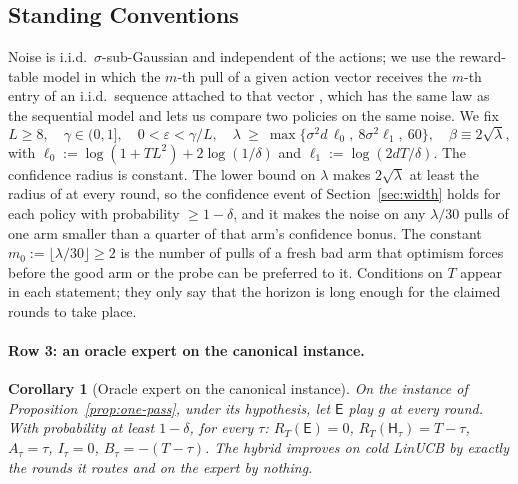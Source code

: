 \documentclass{article}
\newtheorem{corollary}{Corollary}
\theoremstyle{definition}
\theoremstyle{remark}
\newcommand{\eps}{\varepsilon}
\theoremstyle{remark}
\newcommand{\Exp}{\mathsf{E}}
\newcommand{\Hyb}{\mathsf{H}}
\begin{document}
\subsection{Standing Conventions}
\label{sec:template}

Noise is i.i.d.\ $\sigma$-sub-Gaussian and independent of the actions; we use
the reward-table model in which the $m$-th pull of a given action vector
receives the $m$-th entry of an i.i.d.\ sequence attached to that vector
\cite[\S4.6]{lattimore2020bandit}, which has the same law as the sequential
model and lets us compare two policies on the same noise. We fix
\begin{equation}
\label{eq:conventions}
L\ge8,\quad \gamma\in(0,1],\quad 0<\eps<\gamma/L,\quad
\lambda\ \ge\ \max\bigl\{\sigma^2d\,\ell_0,\ 8\sigma^2\ell_1,\ 60\bigr\},\quad
\beta\equiv2\sqrt\lambda,
\end{equation}
with $\ell_0:=\log(1+TL^2)+2\log(1/\delta)$ and $\ell_1:=\log(2dT/\delta)$.
The confidence radius is constant. The lower bound on $\lambda$ makes
$2\sqrt\lambda$ at least the radius of \cite{abbasi2011improved} at every
round, so the confidence event of Section~\ref{sec:width} holds for each
policy with probability $\ge1-\delta$, and it makes the noise on any $\lambda/30$
pulls of one arm smaller than a quarter of that arm's confidence bonus. The
constant $m_0:=\lfloor\lambda/30\rfloor\ge2$ is the number of pulls of a
fresh bad arm that optimism forces before the good arm or the probe can be
preferred to it. Conditions on $T$ appear in each statement; they only say
that the horizon is long enough for the claimed rounds to take place.


\paragraph{Row 3: an oracle expert on the canonical instance.}
\begin{corollary}[Oracle expert on the canonical instance]
\label{cor:cat-oracle}
On the instance of Proposition~\ref{prop:one-pass}, under its hypothesis, let
$\Exp$ play $g$ at every round. With probability at least $1-\delta$, for every
$\tau$: $R_T(\Exp)=0$, $R_T(\Hyb_\tau)=T-\tau$, $A_\tau=\tau$, $I_\tau=0$,
$B_\tau=-(T-\tau)$. The hybrid improves on cold LinUCB by exactly the rounds
it routes and on the expert by nothing.
\end{corollary}
\end{document}

